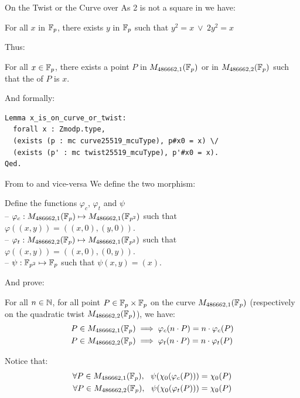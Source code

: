 \documentclass[8pt,aspectratio=169]{beamer}
\begin{document}
%
%
\begin{frame}[fragile]{On the Twist or the Curve over }
As 2 is not a square in  we have:
\begin{lemma}
  For all $x$ in $\mathbb{F}_{p}$, there exists $y$ in $\mathbb{F}_{p}$ such that
  $y^2 = x\ \lor\ 2y^2 = x$
\end{lemma}

Thus:
\begin{lemma}
  For all $x \in \mathbb{F}_{p}$, there exists a point $P$ in $M_{486662,1}(\mathbb{F}_{p})$ or
  in $M_{486662,2}(\mathbb{F}_{p})$ such that the \xcoord of $P$ is $x$.
\end{lemma}

And formally:
\begin{lstlisting}[language=Coq, basicstyle=\normalsize]
Lemma x_is_on_curve_or_twist:
  forall x : Zmodp.type,
  (exists (p : mc curve25519_mcuType), p#x0 = x) \/
  (exists (p' : mc twist25519_mcuType), p'#x0 = x).
Qed.
\end{lstlisting}
\end{frame}


%
%
\begin{frame}{From  to  and vice-versa}
We define the two morphism:
\begin{dfn}
Define the functions $\varphi_c$, $\varphi_t$ and $\psi$\\
-- $\varphi_c: M_{486662,1}(\mathbb{F}_{p}) \mapsto M_{486662,1}(\mathbb{F}_{p^2})$ such that $\varphi((x,y)) = ((x,0), (y,0))$.\\
-- $\varphi_t: M_{486662,2}(\mathbb{F}_{p}) \mapsto M_{486662,1}(\mathbb{F}_{p^2})$ such that $\varphi((x,y)) = ((x,0), (0,y))$.\\
-- $\psi: \mathbb{F}_{p^2} \mapsto \mathbb{F}_{p}$ such that $\psi(x,y) = (x)$.
\end{dfn}

And prove:
\begin{lemma}
  For all $n \in \mathbb{N}$, for all point $P\in\mathbb{F}_{p}\times\mathbb{F}_{p}$ on the curve
  $M_{486662,1}(\mathbb{F}_{p})$ (respectively on the quadratic twist $M_{486662,2}(\mathbb{F}_{p})$), we have:
  \begin{align*}
  P \in M_{486662,1}(\mathbb{F}_{p}) &\implies \varphi_c(n \cdot P) = n \cdot \varphi_c(P)\\
  P \in M_{486662,2}(\mathbb{F}_{p}) &\implies \varphi_t(n \cdot P) = n \cdot \varphi_t(P)
  \end{align*}
\end{lemma}

Notice that:
\begin{align*}
\forall P \in M_{486662,1}(\mathbb{F}_{p}),\ \ \psi(\chi_0(\varphi_c(P))) = \chi_0(P)\\
\forall P \in M_{486662,2}(\mathbb{F}_{p}),\ \ \psi(\chi_0(\varphi_t(P))) = \chi_0(P)
\end{align*}

\end{frame}
\end{document}
